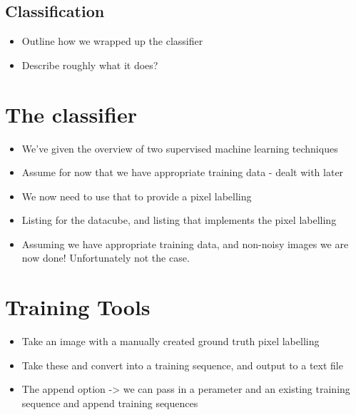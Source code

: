 \documentclass[12pt,twoside,notitlepage]{report}
\begin{document}
        \subsection{Classification}
            \begin{framed}
                \begin{itemize}
                    \item Outline how we wrapped up the classifier
                    \item Describe roughly what it does?
                \end{itemize}
            \end{framed}

    \section{The classifier} \label{sec:pixel_label}
        \begin{itemize}
            \item We've given the overview of two supervised machine learning techniques
            \item Assume for now that we have appropriate training data - dealt with later
            \item We now need to use that to provide a pixel labelling
            \item Listing for the datacube, and listing that implements the pixel labelling
            \item Assuming we have appropriate training data, and non-noisy images we are now done! Unfortunately not the case.
        \end{itemize}

    \section{Training Tools} \label{sec:training_tools}
        \begin{itemize}
            \item Take an image with a manually created ground truth pixel labelling
            \item Take these and convert into a training sequence, and output to a text file
            \item The append option -> we can pass in a perameter and an existing training sequence and append training sequences
        \end{itemize}
\end{document}
